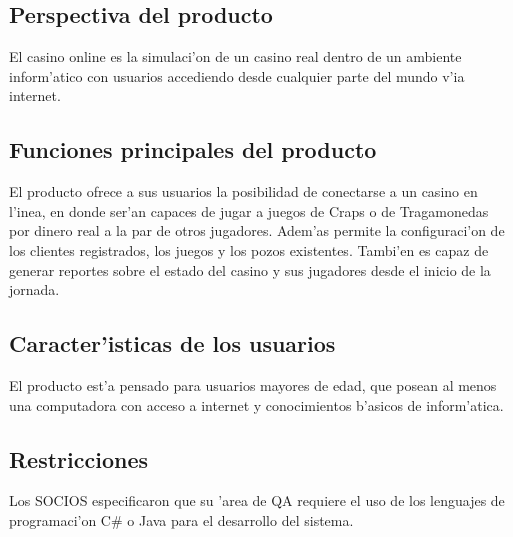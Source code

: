  \subsection{ Perspectiva del producto	}
El casino online es la simulaci'on de un casino real dentro de un ambiente inform'atico con usuarios accediendo desde cualquier parte del mundo v'ia internet.

 \subsection{ Funciones principales del producto }
El producto ofrece a sus usuarios la posibilidad de conectarse a un casino en l'inea, en donde ser'an capaces de jugar a juegos de Craps o de Tragamonedas por dinero real a la par de otros jugadores. Adem'as permite la configuraci'on de los clientes registrados, los juegos y los pozos existentes. Tambi'en es capaz de generar reportes sobre el estado del casino y sus jugadores desde el inicio de la jornada.

 \subsection{ Caracter'isticas de los usuarios }
El producto est'a pensado para usuarios mayores de edad, que posean al menos una computadora con acceso a internet y conocimientos b'asicos de inform'atica.

 \subsection{ Restricciones }
Los SOCIOS especificaron que su 'area de QA requiere el uso de los lenguajes de programaci'on C\# o Java para el desarrollo del sistema.

